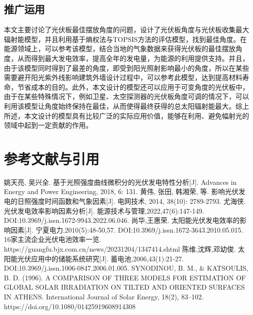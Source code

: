 \documentclass[withoutpreface,bwprint]{cumcmthesis} %
\begin{document}
\subsection{推广运用}

本文主要讨论了光伏板最佳摆放角度的问题，设计了光伏板角度与光伏板收集最大辐射能模型，并且利用基于熵权法与TOPSIS方法的评估模型，找到最佳角度。在能源领域上，可以参考该模型，结合当地的气象数据来获得光伏板的最佳摆放角度，从而得到最大发电效率，提高全年的发电量，为能源的利用提供支持。并且，由于该模型同时得到了最差的角度，即受到阳光照射影响最小的角度，所以在某些需要避开阳光紫外线影响建筑外墙设计过程中，可以参考此模型，达到提高材料寿命，节省成本的目的。此外，本文设计的模型还可以应用于可变角度的光伏板中，由于在某些特殊情况下，例如卫星、太空探测器的光伏板角度可调的情况下，可以利用该模型让角度始终保持在最佳，从而使得最终获得的总太阳辐射能最大。综上所述，本文设计的模型具有比较广泛的实际应用价值，能够在利用、避免幅射光的领域中起到一定贡献的作用。

\newpage

\section{参考文献与引用}

\begin{thebibliography}{9}%
    姚天亮, 吴兴全. 基于光照强度曲线微积分的光伏发电特性分析[J]. Advances in Energy and Power Engineering, 2018, 6: 131.
    黄伟, 张田, 韩湘荣, 等. 影响光伏发电的日照强度时间函数和气象因素[J]. 电网技术, 2014, 38(10): 2789-2793.
    尤海侠. 光伏发电效率影响因素分析[J]. 能源技术与管理,2022,47(6):147-149. DOI:10.3969/j.issn.1672-9943.2022.06.046.
    尚华,王惠荣. 太阳能光伏发电效率的影响因素[J]. 宁夏电力,2010(5):48-50,57. DOI:10.3969/j.issn.1672-3643.2010.05.015.
    16家主流企业光伏电池效率一览. https://guangfu.bjx.com.cn/news/20231204/1347414.shtml
    陈维,沈辉,邓幼俊. 太阳能光伏应用中的储能系统研究[J]. 蓄电池,2006,43(1):21-27. DOI:10.3969/j.issn.1006-0847.2006.01.005.
    SYNODINOU, B. M., \& KATSOULIS, B. D. (1996). A COMPARISON OF THREE MODELS FOR ESTIMATION OF GLOBAL SOLAR IRRADIATION ON TILTED AND ORIENTED SURFACES IN ATHENS. International Journal of Solar Energy, 18(2), 83–102. https://doi.org/10.1080/01425919608914308
\end{thebibliography}

\newpage
\end{document}
